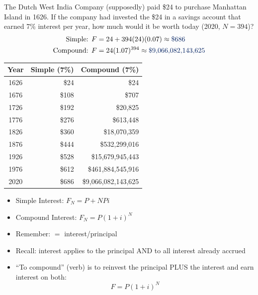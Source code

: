 \begin{example}
    The Dutch West India Company (supposedly) paid \$24 to purchase Manhattan Island in 1626. If the company had invested the \$24 in a savings account that earned 7\% interest per year, how much would it be worth today (2020, $N = 394$)?
    \begin{align*}
        \text{Simple: } F &= 24 + 394(24)(0.07) \approx \db{\$686}\\
        \text{Compound: } F &= 24(1.07)^{394} \approx \db{\$9{,}066{,}082{,}143{,}625}
    \end{align*}
    \begin{center}
    \begin{tabular}{c|r|r}
        Year & Simple (7\%) & Compound (7\%) \\\hline
        1626 & \$24 & \$24 \\
        1676 & \$108 & \$707 \\
        1726 & \$192 & \$20,825 \\
        1776 & \$276 & \$613,448 \\
        1826 & \$360 & \$18,070,359 \\
        1876 & \$444 & \$532,299,016 \\
        1926 & \$528 & \$15,679,945,443 \\
        1976 & \$612 & \$461,884,545,916 \\
        2020 & \$686 & \$9,066,082,143,625
    \end{tabular}
    \end{center}
\end{example}

\begin{itemize}
    \item Simple Interest: $F_N = P+NPi$
    \item Compound Interest: $F_N = P(1+i)^N$
    \item Remember:  $=$ interest/principal
\end{itemize}





\begin{itemize}
    \item Recall:  interest applies to the principal AND to all interest already accrued
    \item ``To compound'' (verb) is to reinvest the principal PLUS the interest and earn interest on both:
    \[F = P(1+i)^N\]
\end{itemize}

